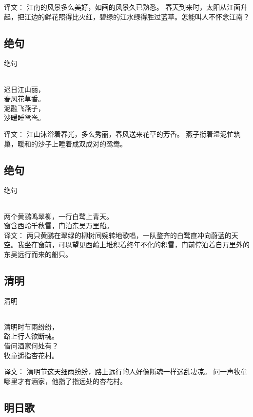 译文：
江南的风景多么美好，如画的风景久已熟悉。
春天到来时，太阳从江面升起，把江边的鲜花照得比火红，碧绿的江水绿得胜过蓝草。怎能叫人不怀念江南？

\subsection{绝句}

\noindent 绝句

  \\

\noindent 迟日江山丽，\\春风花草香。\\
泥融飞燕子，\\沙暖睡鸳鸯。

译文：
江山沐浴着春光，多么秀丽，春风送来花草的芳香。
燕子衔着湿泥忙筑巢，暖和的沙子上睡着成双成对的鸳鸯。

\subsection{绝句}

\noindent 绝句

  \\

\noindent 两个黄鹂鸣翠柳，一行白鹭上青天。\\
窗含西岭千秋雪，门泊东吴万里船。\\

译文：
两只黄鹂在翠绿的柳树间婉转地歌唱，一队整齐的白鹭直冲向蔚蓝的天空。我坐在窗前，可以望见西岭上堆积着终年不化的积雪，门前停泊着自万里外的东吴远行而来的船只。



\subsection{清明}

\noindent 清明

  \\

\noindent 清明时节雨纷纷，\\路上行人欲断魂。\\
借问酒家何处有？\\牧童遥指杏花村。

译文：
清明节这天细雨纷纷，路上远行的人好像断魂一样迷乱凄凉。
问一声牧童哪里才有酒家，他指了指远处的杏花村。

\subsection{明日歌}

